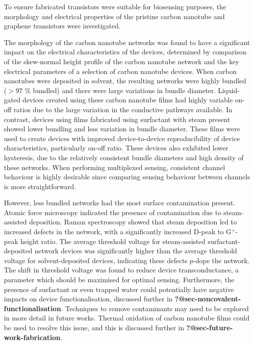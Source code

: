 \documentclass[
  letterpaper,
  DIV=11,
  numbers=noendperiod]{scrartcl}
\begin{document}
To ensure fabricated transistors were suitable for biosensing purposes,
the morphology and electrical properties of the pristine carbon nanotube
and graphene transistors were investigated.

The morphology of the carbon nanotube networks was found to have a
significant impact on the electrical characteristics of the devices,
determined by comparison of the skew-normal height profile of the carbon
nanotube network and the key electrical parameters of a selection of
carbon nanotube devices. When carbon nanotubes were deposited in
solvent, the resulting networks were highly bundled (\(>97\) \% bundled)
and there were large variations in bundle diameter. Liquid-gated devices
created using these carbon nanotube films had highly variable on-off
ratios due to the large variation in the conductive pathways available.
In contrast, devices using films fabricated using surfactant with steam
present showed lower bundling and less variation in bundle diameter.
These films were used to create devices with improved device-to-device
reproducibility of device characteristics, particularly on-off ratio.
These devices also exhibited lower hysteresis, due to the relatively
consistent bundle diameters and high density of these networks. When
performing multiplexed sensing, consistent channel behaviour is highly
desirable since comparing sensing behaviour between channels is more
straightforward.

However, less bundled networks had the most surface contamination
present. Atomic force microscopy indicated the presence of contamination
due to steam-assisted deposition. Raman spectroscopy showed that steam
deposition led to increased defects in the network, with a significantly
increased D-peak to G\(^+\)-peak height ratio. The average threshold
voltage for steam-assisted surfactant-deposited network devices was
significantly higher than the average threshold voltage for
solvent-deposited devices, indicating these defects \(p\)-dope the
network. The shift in threshold voltage was found to reduce device
transconductance, a parameter which should be maximised for optimal
sensing. Furthermore, the presence of surfactant or even trapped water
could potentially have negative impacts on device functionalisation,
discussed further in \textbf{?@sec-noncovalent-functionalisation}.
Techniques to remove contaminants may need to be explored in more detail
in future works. Thermal oxidation of carbon nanotube films could be
used to resolve this issue, and this is discussed further in
\textbf{?@sec-future-work-fabrication}.
\end{document}
